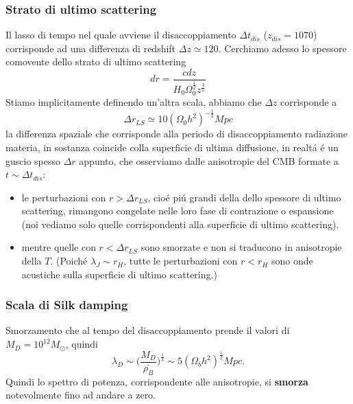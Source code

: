 \documentclass[12pt, a4paper]{article}
\begin{document}
\subsubsection{Strato di ultimo scattering}
Il lasso di tempo nel quale avviene il disaccoppiamento $\Delta t_{dis}$ ($z_{dis}=1070$)  corrisponde ad una differenza di redshift $ \Delta z \simeq 120$. Cerchiamo adesso lo spessore comovente dello strato di ultimo scattering
\begin{equation}
dr= \frac{cdz}{H_0 \Omega_0^{\frac{1}{2}}z^{\frac{3}{2}}}
\end{equation}
Stiamo implicitamente definendo un'altra scala, abbiamo che $\Delta z$ corrisponde a
\begin{equation}
\Delta r_{LS}\simeq 10(\Omega_0 h^2)^{-\frac{1}{2}} Mpc
\end{equation}
la differenza spaziale che corrisponde alla periodo di disaccoppiamento radiazione materia, in sostanza coincide colla superficie di ultima diffusione, in realt\'{a} \'{e} un guscio spesso $\Delta r$ appunto, che osserviamo dalle anisotropie del CMB formate a $t\sim \Delta t_{dis}$:
\begin{itemize}
\item le perturbazioni con $r>\Delta r_{LS}$, cio\'{e} pi\'{u} grandi della dello spessore di ultimo scattering, rimangono congelate nelle loro fase di contrazione o espansione (noi vediamo solo quelle corrispondenti alla superficie di ultimo scattering).
\item mentre quelle con $r<\Delta r_{LS}$ sono smorzate e non si traducono in anisotropie della $T$.
(Poich\'{e} $\lambda_J \sim r_H$, tutte le perturbazioni con $r<r_H$ sono onde acustiche sulla superficie di ultimo scattering.)
\end{itemize}







\subsubsection{Scala di Silk damping}
Smorzamento che al tempo del disaccoppiamento  prende il valori di $M_D=10^{12} M_\odot$, quindi
\begin{equation}
\lambda_D\sim \biggl( \frac{M_D}{\bar{\rho_B}}\biggr)^{\frac{1}{3}} \sim 5 (\Omega_b h^2)^{\frac{1}{2}} Mpc.
\end{equation}
Quindi lo spettro di potenza, corrispondente alle anisotropie, si \textbf{smorza} notevolmente fino ad andare a zero. 
\end{document}
